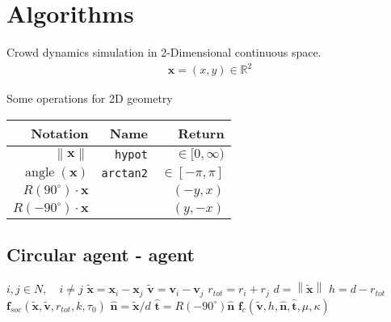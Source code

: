 \section{Algorithms}

Crowd dynamics simulation in 2-Dimensional continuous space.
\begin{align}
\mathbf{x} = (x, y) \in \mathbb{R}^{2}
\end{align}

Some operations for 2D geometry
\begin{table}[H]
\begin{tabularx}{1.0\linewidth}{ R R R }
Notation & Name & Return \\
\hline
\hline
$ \left\| \mathbf{x} \right\| $      & \texttt{hypot} & $ \in [0, \infty) $ \\
$ \operatorname{angle}(\mathbf{x}) $ & \texttt{arctan2} & $ \in [-\pi, \pi] $ \\
$ R(90^{\circ}) \cdot \mathbf{x} $   &  & $ (-y, x) $ \\
$ R(-90^{\circ}) \cdot \mathbf{x} $  &  & $ (y, -x) $ \\
\end{tabularx}
\end{table}



\subsection{Circular agent - agent}
\begin{algorithmic}[1]
\ENSURE $ i,j \in N, \quad i \neq j $
\STATE $ \tilde{\mathbf{x}} = \mathbf{x}_{i} - \mathbf{x}_{j} $
\STATE $ \tilde{\mathbf{v}} = \mathbf{v}_{i} - \mathbf{v}_{j} $
\STATE $ r_{tot} = r_{i} + r_{j} $ 
\STATE $ d = \left\|\tilde{\mathbf{x}}\right\| $
\STATE $ h = d - r_{tot} $
\STATE
{}
\STATE $ \mathbf{f}_{soc}(\tilde{\mathbf{x}}, \tilde{\mathbf{v}}, r_{tot}, k, \tau_{0}) $
\ENDIF
\STATE
{}
\STATE $ \hat{\mathbf{n}} = \tilde{\mathbf{x}} / d $
\STATE $ \hat{\mathbf{t}} = R(-90^{\circ}) \hat{\mathbf{n}} $
\STATE $ \mathbf{f}_{c}(\tilde{\mathbf{v}}, h, \hat{\mathbf{n}}, \hat{\mathbf{t}}, \mu, \kappa) $
\ENDIF
\STATE $  $
\end{algorithmic}

